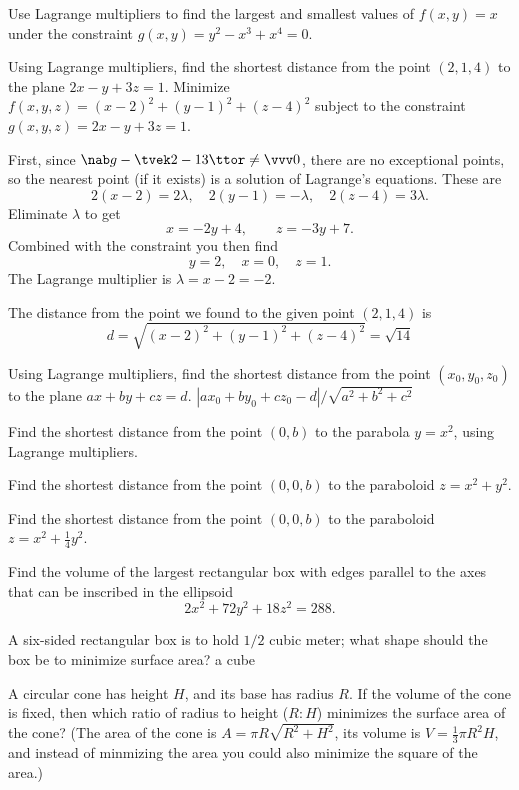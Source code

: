 \begin{multicols}{2}
\endanswer

\problem Use Lagrange multipliers to find the largest and 
smallest values of $f(x, y) = x$ under the constraint $g(x, y) =
y^2-x^3+x^4 = 0$.

\problem \subprob Using Lagrange multipliers, 
find the shortest distance from  the point $(2, 1, 4)$ to the plane
$2x-y+3z=1$.  
\answer  
Minimize $f(x, y, z) = (x-2)^2 + (y-1)^2 + (z-4)^2$ subject to the
constraint $g(x, y, z) = 2x-y+3z = 1$.

First, since $\nab g - \tvek 2 \\ -1 \\ 3\ttor \neq \vvv0$, there are
no exceptional points, so the nearest point (if it exists) is a
solution of Lagrange's equations.  These are
\[
2(x-2) = 2\lambda, \quad
2(y-1) = -\lambda, \quad
2(z-4) = 3\lambda.
\]
Eliminate $\lambda$ to get 
\[
x=-2y+4, \qquad 
z = -3y+7.
\]
Combined with the constraint you then find
\[
y= 2,\quad x=  0, \quad z= 1.
\]
The Lagrange multiplier is $\lambda = x-2 = -2$.

The distance from the point we found to the given point $(2, 1, 4)$ is
\[
d = \sqrt{(x-2)^2 + (y-1)^2 + (z-4)^2}  
=\sqrt{14}
\]
\endanswer

\subprob Using Lagrange multipliers, find the shortest distance from  
the point $(x_0,y_0,z_0)$ to the plane $ax+by+cz=d$.  
\answer   
$|ax_0+by_0+cz_0-d|/\sqrt{a^2+b^2+c^2}$
\endanswer


\problem 
\subprob Find the shortest distance from the point $(0,b)$ 
to the parabola  $y=x^2$,  using Lagrange multipliers.

\subprob Find the shortest distance from the point $(0,0,b)$ to the  
paraboloid $z=x^2+y^2$.

\subprob Find the shortest distance from the point $(0,0,b)$ to the  
paraboloid $z=x^2+\frac14y^2$.


\problem Find the volume of the largest rectangular box with edges parallel  
to the axes that can be inscribed in the ellipsoid $$2x^2+72y^2+18z^2=288.$$

\problem A six-sided rectangular box is to hold $1/2$ cubic meter; what  
shape should the box be to minimize surface area? 
\answer  a cube  
\endanswer

\problem A circular cone has height $H$, and its  
base has radius $R$.  If the volume of the cone is fixed, then which
ratio of radius to height ($R:H$) minimizes the surface area of the
cone?  (The area of the cone is $A = \pi R\sqrt{R^2+H^2}$, its volume
is $V=\frac13\pi R^2H$, and instead of minmizing the area you could
also minimize the square of the area.)


\end{multicols}

